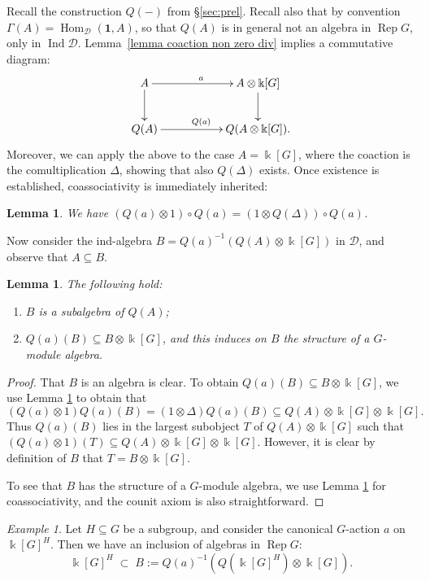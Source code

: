 \documentclass[11pt]{amsart}
\def\Ind{\operatorname{Ind}}
\def\Hom{\operatorname{Hom}}
\def\Ds{\mathscr{D}}
\def\bk{\Bbbk}
\def\Rep{\operatorname{Rep}}
\def\sub{\subseteq}
\newtheorem{lemma}[thm]{Lemma}
\theoremstyle{definition}
\theoremstyle{remark}
\newtheorem{example}[thm]{Example}
\numberwithin{equation}{section}
\newcommand{\unit}{\mathbf{1}}
\begin{document}
Recall the construction $Q(-)$ from \S \ref{sec:prel}. Recall also that by convention $\Gamma(A)=\Hom_{\Ds}(\unit,A)$, so that $Q(A)$ is in general not an algebra in $\Rep G$, only in $\Ind\Ds$.
Lemma~\ref{lemma coaction non zero div} implies a commutative diagram:
\[
\xymatrix{
A \ar[rr]^{a} \ar[d] && A\otimes\Bbbk[G]\ar[d]\\
Q(A)\ar[rr]^{Q(a)} && Q(A\otimes\Bbbk[G]).
}
\]
Moreover, we can apply the above to the case $A=\bk[G]$, where the coaction is the comultiplication $\Delta$, showing that also $Q(\Delta)$ exists. Once existence is established, coassociativity is immediately inherited:
\begin{lemma}\label{lemma Q(a) coassoc}
    We have $(Q(a)\otimes 1)\circ Q(a)=(1\otimes Q(\Delta))\circ Q(a)$.
\end{lemma}


Now consider the ind-algebra $B=Q(a)^{-1}(Q(A)\otimes\Bbbk[G])$ in $\Ds$, and observe that $A\sub B$.  

\begin{lemma}\label{lemma largest ratl subalg}
The following hold:
\begin{enumerate}
    \item $B$ is a subalgebra of $Q(A)$;
    \item $Q(a)(B)\sub B\otimes\Bbbk[G]$, and this induces on $B$ the structure of a $G$-module algebra.
\end{enumerate}\end{lemma}

\begin{proof}
    That $B$ is an algebra is clear.  To obtain $Q(a)(B)\sub B\otimes \Bbbk[G]$, we use Lemma \ref{lemma Q(a) coassoc} to obtain that
    \[
    (Q(a)\otimes 1)Q(a)(B)=(1\otimes\Delta)Q(a)(B)\sub Q(A)\otimes\Bbbk[G]\otimes\Bbbk[G].
    \]
    Thus $Q(a)(B)$ lies in the largest subobject $T$ of $Q(A)\otimes\Bbbk[G]$ such that $(Q(a)\otimes 1)(T)\sub Q(A)\otimes\Bbbk[G]\otimes\Bbbk[G]$.  However, it is clear by definition of $B$ that $T=B\otimes\Bbbk[G]$. 

    To see that $B$ has the structure of a $G$-module algebra, we use Lemma \ref{lemma Q(a) coassoc} for coassociativity, and the counit axiom is also straightforward.
\end{proof}


\begin{example}\label{ex largest ratl subalg}
    Let $H\sub G$ be a subgroup, and consider the canonical $G$-action $a$ on $\bk[G]^H$. Then we have an inclusion of algebras in $\Rep G$:
    \[\bk[G]^H\;\subset\; B:=Q(a)^{-1}(Q(\bk[G]^H)\otimes\Bbbk[G]).\]
\end{example}
\end{document}
